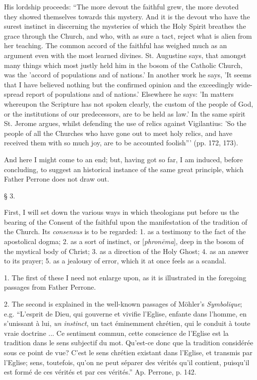 His lordship proceeds: ``The more devout the
faithful grew, the more devoted they showed themselves towards this
mystery. And it is the devout who have the surest instinct in discerning
the mysteries of which the Holy Spirit breathes the grace through the
Church, and who, with as sure a tact, reject what is alien from her
teaching. The common accord of the faithful has weighed much as an
argument even with the most learned divines. St. Augustine says, that
amongst many things which most justly held him in the bosom of the
Catholic Church, was the 'accord of populations and of nations.' In
another work he says, 'It seems that I have believed nothing but the
confirmed opinion and the exceedingly wide-spread report of populations
and of nations.' Elsewhere he says: 'In matters whereupon the Scripture
has not spoken clearly, the custom of the people of God, or the
institutions of our predecessors, are to be held as law.' In the same
spirit St. Jerome argues, whilst defending the use of relics against
Vigilantius: 'So the people of all the Churches who have gone out to
meet holy relics, and have received them with so much joy, are to be
accounted foolish''' (pp. 172, 173).

And here I might come to an end; but, having got so
far, I am induced, before concluding, to suggest an historical instance
of the same great principle, which Father Perrone does not draw out.

§ 3.

First, I will set down the various ways in which
theologians put before us the bearing of the Consent of the faithful
upon the manifestation of the tradition of the Church. Its \emph{consensus}
is to be regarded: 1. as a testimony to the fact of the apostolical
dogma; 2. as a sort of instinct, or [\emph{phron\={e}ma}], deep in
the bosom of the mystical body of Christ; 3. as a direction of the Holy
Ghost; 4. as an answer to its prayer; 5. as a jealousy of error, which
it at once feels as a scandal.

1. The first of these I need not enlarge upon, as
it is illustrated in the foregoing passages from Father Perrone.

2. The second is explained in the well-known
passages of Möhler's \emph{Symbolique}; e.g. ``L'esprit de Dieu, qui
gouverne et vivifie l'Eglise, enfante dans l'homme, en s'unissant
à lui, \emph{un instinct}, un tact éminemment chrétien, qui le
conduit à toute vraie doctrine ... Ce sentiment commun, cette
conscience de l'Eglise est la tradition dans le sens subjectif du mot.
Qu'est-ce donc que la tradition considérée sous ce point de vue? C'est
le sens chrétien existant dans l'Eglise, et transmis par l'Eglise; sens,
toutefois, qu'on ne peut séparer des vérités qu'il contient, puisqu'il
est formé de ces vérités et par ces vérités.'' Ap. Perrone, p. 142.

